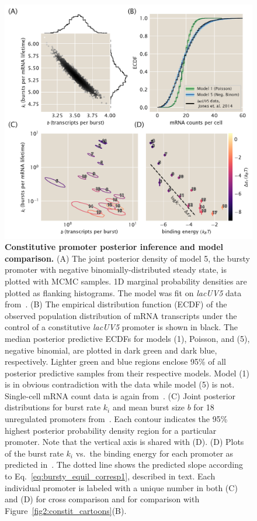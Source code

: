 \begin{figure}%
\centering
\includegraphics[width=\textwidth]{../../figures/main/fig03.pdf}
\caption{\textbf{Constitutive promoter posterior inference and model
comparison.} (A) The joint posterior density of model 5, the bursty promoter
with negative binomially-distributed steady state, is plotted with MCMC samples.
1D marginal probability densities are plotted as flanking histograms. The model
was fit on \textit{lacUV5} data from~\cite{Jones2014}. (B) The empirical
distribution function (ECDF) of the observed population distribution of mRNA
transcripts under the control of a constitutive \textit{lacUV5} promoter is
shown in black. The median posterior predictive ECDFs for models (1), Poisson,
and (5), negative binomial, are plotted in dark green and dark blue,
respectively. Lighter green and blue regions enclose 95\% of all posterior
predictive samples from their respective models. Model (1) is in obvious
contradiction with the data while model (5) is not. Single-cell mRNA count data
is again from~\cite{Jones2014}. (C) Joint posterior distributions for burst rate
$k_i$ and mean burst size $b$ for 18 unregulated promoters
from~\cite{Jones2014}. Each contour indicates the 95\% highest posterior
probability density region for a particular promoter. Note that the vertical
axis is shared with (D). (D) Plots of the burst rate $k_i$ vs.\ the binding
energy for each promoter as predicted in~\cite{Brewster2012}. The dotted line
shows the predicted slope according to Eq.~\ref{eq:bursty_equil_corresp1},
described in text. Each individual promoter is labeled with a unique number in
both (C) and (D) for cross comparison and for comparison with 
Figure~\ref{fig2:constit_cartoons}(B).}
\label{fig:constit_post_full}
\end{figure}

